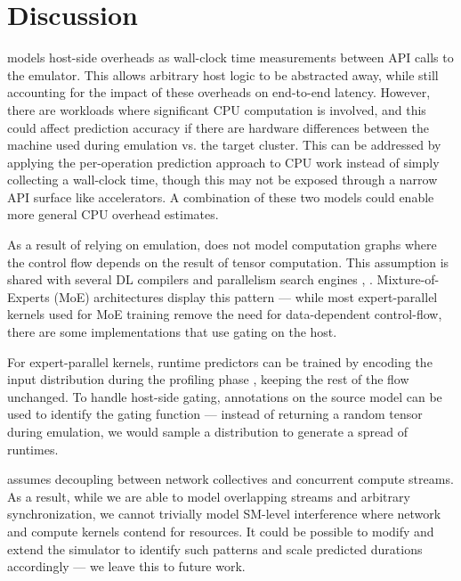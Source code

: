 


\section{Discussion}
 \sysname models host-side overheads as wall-clock time measurements between API calls to the emulator. This allows arbitrary host logic to be abstracted away, while still accounting for the impact of these overheads on end-to-end latency. However, there are workloads where significant CPU computation is involved, and this could affect prediction accuracy if there are hardware differences between the machine used during emulation vs. the target cluster. This can be addressed by applying the per-operation prediction approach to CPU work instead of simply collecting a wall-clock time, though this may not be exposed through a narrow API surface like accelerators. A combination of these two models could enable more general CPU overhead estimates.

 As a result of relying on emulation, \sysname does not model computation graphs where the control flow depends on the result of tensor computation. This assumption is shared with several DL compilers and parallelism search engines \cite{zheng2022alpa}, \cite{flexflow}. Mixture-of-Experts (MoE) architectures display this pattern --- while most expert-parallel kernels used for MoE training \cite{deepep2025, pplxrepo} remove the need for data-dependent control-flow, there are some implementations that use gating on the host.

For expert-parallel kernels, runtime predictors can be trained by encoding the input distribution during the profiling phase \cite{lin2025apexextensibledynamismawaresimulator, vidur}, keeping the rest of the \sysname flow unchanged. To handle host-side gating, annotations on the source model can be used to identify the gating function --- instead of returning a random tensor during emulation, we would sample a distribution to generate a spread of runtimes.

 \sysname assumes decoupling between network collectives and concurrent compute streams. As a result, while we are able to model overlapping streams and arbitrary synchronization, we cannot trivially model SM-level interference where network and compute kernels contend for resources. It could be possible to modify and extend the simulator to identify such patterns and scale predicted durations accordingly --- we leave this to future work.
